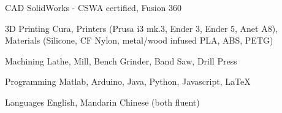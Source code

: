 


\begin{cvskills}


\cvskill
{CAD} %
{SolidWorks - CSWA certified, Fusion 360} %


\cvskill
{3D Printing} %
{Cura, Printers (Prusa i3 mk.3, Ender 3, Ender 5, Anet A8), Materials (Silicone, CF Nylon, metal/wood infused PLA, ABS, PETG)} %

\cvskill
{Machining}
{Lathe, Mill, Bench Grinder, Band Saw, Drill Press}

\cvskill
{Programming} %
{Matlab, Arduino, Java, Python, Javascript, LaTeX} %

\cvskill
{Languages}
{English, Mandarin Chinese (both fluent)}


\end{cvskills}